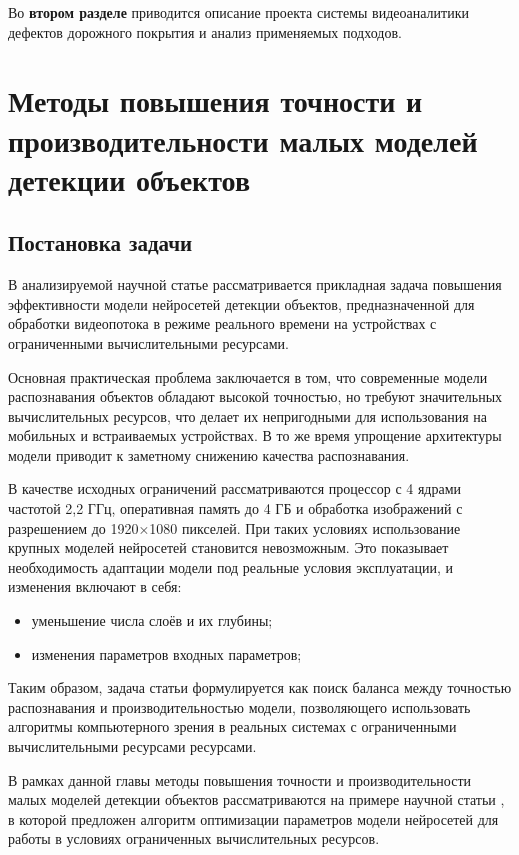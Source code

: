 \documentclass[a4paper,12pt]{article}
\begin{document}
Во \textbf{втором разделе} приводится описание проекта системы видеоаналитики дефектов дорожного покрытия и анализ применяемых подходов.

\newpage
\section{Методы повышения точности и производительности малых моделей детекции объектов}

\subsection{Постановка задачи}

В анализируемой научной статье рассматривается прикладная задача повышения эффективности модели нейросетей детекции объектов, предназначенной для обработки видеопотока в режиме реального времени на устройствах с ограниченными вычислительными ресурсами.

Основная практическая проблема заключается в том, что современные модели распознавания объектов обладают высокой точностью, но требуют значительных вычислительных ресурсов, что делает их непригодными для использования на мобильных и встраиваемых устройствах. В то же время упрощение архитектуры модели приводит к заметному снижению качества распознавания.

В качестве исходных ограничений рассматриваются процессор с 4 ядрами частотой 2,2 ГГц, оперативная память до 4 ГБ и обработка изображений с разрешением до 1920×1080 пикселей. При таких условиях использование крупных моделей нейросетей становится невозможным. Это показывает необходимость адаптации модели под реальные условия эксплуатации, и изменения включают в себя:
\begin{itemize}
    \item уменьшение числа слоёв и их глубины;
    \item изменения параметров входных параметров;
\end{itemize}

Таким образом, задача статьи формулируется как поиск баланса между точностью распознавания и производительностью модели, позволяющего использовать алгоритмы компьютерного зрения в реальных системах с ограниченными вычислительными ресурсами ресурсами.

В рамках данной главы методы повышения точности и производительности малых моделей детекции объектов рассматриваются на примере научной статьи \cite{taema}, в которой предложен алгоритм оптимизации параметров модели нейросетей для работы в условиях ограниченных вычислительных ресурсов.
\end{document}
